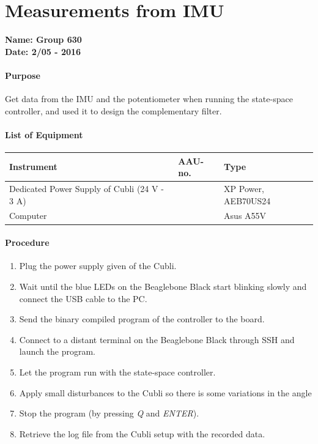 \chapter{Measurements from IMU}\label{app:IMUMeasurementsAppendix}
\textbf{Name: Group 630}\\
\textbf{Date: 2/05 - 2016}

\subsubsection{Purpose}
Get data from the IMU and the potentiometer when running the state-space controller, and used it to design the complementary filter.             

\subsubsection{List of Equipment}
\begin{table}[H]
	\centering
	\begin{tabular}{|l|l|p{4.3cm}|}
		\hline%
		\textbf{Instrument}                        &  \textbf{AAU-no.}  &  \textbf{Type}       \\
		\hline%
		Dedicated Power Supply of Cubli \small{(24 V - 3 A)} &               &  XP Power, AEB70US24 \\
		\hline%
		Computer                &              &  Asus A55V          \\
		\hline%
	\end{tabular}
\end{table}
\subsubsection{Procedure}
\begin{enumerate}
	  \item Plug the power supply given of the Cubli.
	  \item Wait until the blue LEDs on the Beaglebone Black start blinking slowly and connect the USB cable to the PC.
	  \item Send the binary compiled program of the controller to the board.
	  \item Connect to a distant terminal on the Beaglebone Black through SSH and launch the program.
	  \item Let the program run with the state-space controller.
	  \item Apply small disturbances to the Cubli so there is some variations in the angle
	  \item Stop the program (by pressing \textit{Q} and \textit{ENTER}).
	  \item Retrieve the log file from the Cubli setup with the recorded data.
\end{enumerate}

